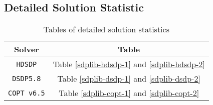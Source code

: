 \subsection{Detailed Solution Statistic}
\begin{table}[H]
\caption{Tables of detailed solution statistics}
  \begin{tabular}{cc}
  \toprule
  Solver & Table \\
  \midrule
   \texttt{HDSDP} & Table \ref{sdplib-hdsdp-1} and  \ref{sdplib-hdsdp-2}   \\
    \texttt{DSDP5.8} & Table \ref{sdplib-dsdp-1} and  \ref{sdplib-dsdp-2} \\
    \texttt{COPT v6.5} & Table \ref{sdplib-copt-1} and  \ref{sdplib-copt-2} \\
  	\bottomrule
  \end{tabular}	
\end{table}
